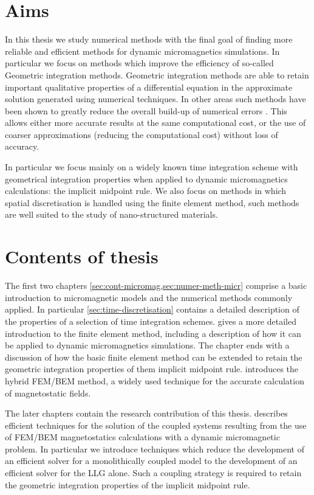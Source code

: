 \section{Aims}

In this thesis we study numerical methods with the final goal of finding more reliable and efficient methods for dynamic micromagnetics simulations.
In particular we focus on methods which improve the efficiency of so-called Geometric integration methods.
Geometric integration methods are able to retain important qualitative properties of a differential equation in the approximate solution generated using numerical techniques.
In other areas such methods have been shown to greatly reduce the overall build-up of numerical errors \cite[77]{Iserles2009}.
This allows either more accurate results at the same computational cost, or the use of coarser approximations (reducing the computational cost) without loss of accuracy.

In particular we focus mainly on a widely known time integration scheme with geometrical integration properties when applied to dynamic micromagnetics calculations: the implicit midpoint rule.
We also focus on methods in which spatial discretisation is handled using the finite element method, such methods are well suited to the study of nano-structured materials.



\section{Contents of thesis}

The first two chapters \cref{sec:cont-micromag,sec:numer-meth-micr} comprise a basic introduction to micromagnetic models and the numerical methods commonly applied.
In particular \cref{sec:time-discretisation} contains a detailed description of the properties of a selection of time integration schemes.
 gives a more detailed introduction to the finite element method, including a description of how it can be applied to dynamic micromagnetics simulations.
The chapter ends with a discussion of how the basic finite element method can be extended to retain the geometric integration properties of them implicit midpoint rule.
 introduces the hybrid FEM/BEM method, a widely used technique for the accurate calculation of magnetostatic fields.

The later chapters contain the research contribution of this thesis.
 describes efficient techniques for the solution of the coupled systems resulting from the use of FEM/BEM magnetostatics calculations with a dynamic micromagnetic problem.
In particular we introduce techniques which reduce the development of an efficient solver for a monolithically coupled model to the development of an efficient solver for the LLG alone.
Such a coupling strategy is required to retain the geometric integration properties of the implicit midpoint rule.

